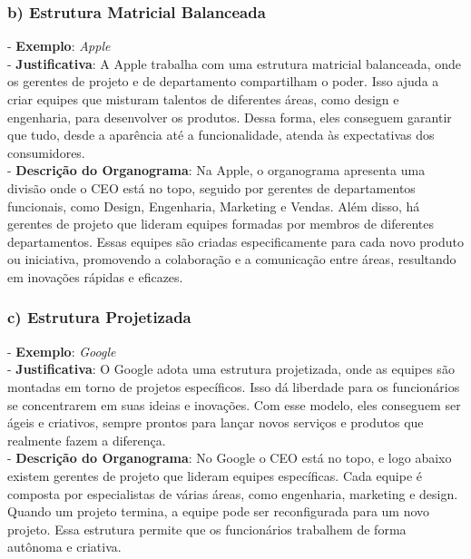 \documentclass{article}
\begin{document}
	\subsubsection*{b) Estrutura Matricial Balanceada}
	- \textbf{Exemplo}: \textit{Apple} \\
	- \textbf{Justificativa}: A Apple trabalha com uma estrutura matricial balanceada, onde os gerentes de projeto e de departamento compartilham o poder. Isso ajuda a criar equipes que misturam talentos de diferentes áreas, como design e engenharia, para desenvolver os produtos. Dessa forma, eles conseguem garantir que tudo, desde a aparência até a funcionalidade, atenda às expectativas dos consumidores. \\
	- \textbf{Descrição do Organograma}: Na Apple, o organograma apresenta uma divisão onde o CEO está no topo, seguido por gerentes de departamentos funcionais, como Design, Engenharia, Marketing e Vendas. Além disso, há gerentes de projeto que lideram equipes formadas por membros de diferentes departamentos. Essas equipes são criadas especificamente para cada novo produto ou iniciativa, promovendo a colaboração e a comunicação entre áreas, resultando em inovações rápidas e eficazes.
	
	\subsubsection*{c) Estrutura Projetizada}
	- \textbf{Exemplo}: \textit{Google} \\
	- \textbf{Justificativa}: O Google adota uma estrutura projetizada, onde as equipes são montadas em torno de projetos específicos. Isso dá liberdade para os funcionários se concentrarem em suas ideias e inovações. Com esse modelo, eles conseguem ser ágeis e criativos, sempre prontos para lançar novos serviços e produtos que realmente fazem a diferença. \\
	- \textbf{Descrição do Organograma}: No Google o CEO está no topo, e logo abaixo existem gerentes de projeto que lideram equipes específicas. Cada equipe é composta por especialistas de várias áreas, como engenharia, marketing e design. Quando um projeto termina, a equipe pode ser reconfigurada para um novo projeto. Essa estrutura permite que os funcionários trabalhem de forma autônoma e criativa.
	
\end{document}
